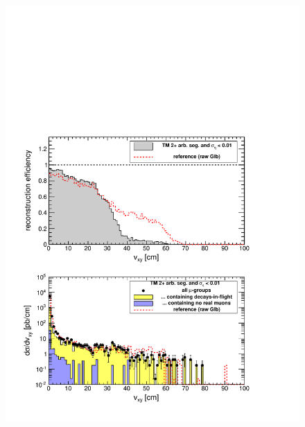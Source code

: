 \documentclass[12pt]{article}
\begin{document}
\begin{figure}
\begin{center}
\begin{multicols}{2}
\includegraphics[width=\linewidth]{fig/backgrounds3_plot/dispvert_TrackerSegMatch2EtaErr.pdf}


\end{multicols}
\end{center}
\end{figure}
\end{document}
